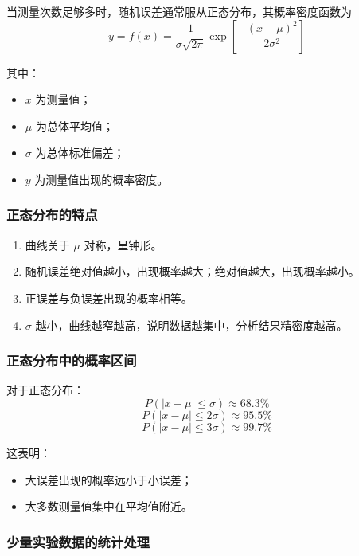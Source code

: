 \documentclass[12pt,a4paper]{article}
\numberwithin{equation}{section}
\begin{document}
当测量次数足够多时，随机误差通常服从正态分布，其概率密度函数为
\begin{equation}
y=f(x)=\frac{1}{\sigma\sqrt{2\pi}}
\exp\left[-\frac{(x-\mu)^2}{2\sigma^2}\right]
\end{equation}

其中：
\begin{itemize}
    \item $x$ 为测量值；
    \item $\mu$ 为总体平均值；
    \item $\sigma$ 为总体标准偏差；
    \item $y$ 为测量值出现的概率密度。
\end{itemize}

\subsubsection{正态分布的特点}

\begin{enumerate}
    \item 曲线关于 $\mu$ 对称，呈钟形。
    \item 随机误差绝对值越小，出现概率越大；绝对值越大，出现概率越小。
    \item 正误差与负误差出现的概率相等。
    \item $\sigma$ 越小，曲线越窄越高，说明数据越集中，分析结果精密度越高。
\end{enumerate}

\subsubsection{正态分布中的概率区间}

对于正态分布：
\begin{equation}
P(|x-\mu|\le \sigma)\approx 68.3\%
\end{equation}
\begin{equation}
P(|x-\mu|\le 2\sigma)\approx 95.5\%
\end{equation}
\begin{equation}
P(|x-\mu|\le 3\sigma)\approx 99.7\%
\end{equation}

这表明：
\begin{itemize}
    \item 大误差出现的概率远小于小误差；
    \item 大多数测量值集中在平均值附近。
\end{itemize}

\subsubsection{少量实验数据的统计处理}
\end{document}
